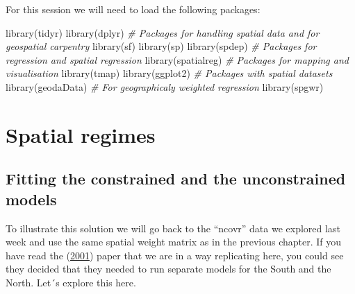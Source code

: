 \documentclass[
  krantz2]{krantz}
\makeatletter
\newenvironment{Shaded}{\begin{snugshade}}{\end{snugshade}}
\newcommand{\CommentTok}[1]{\textcolor[rgb]{0.37,0.37,0.37}{\textit{#1}}}
\newcommand{\FunctionTok}[1]{\textcolor[rgb]{0,0,0}{#1}}
\newcommand{\NormalTok}[1]{#1}
\newenvironment{kframe}{%
\medskip{}
\setlength{\fboxsep}{.8em}
 \def\at@end@of@kframe{}%
 \ifinner\ifhmode%
  \def\at@end@of@kframe{\end{minipage}}%
  \begin{minipage}{\columnwidth}%
 \fi\fi%
 \def\FrameCommand##1{\hskip\@totalleftmargin \hskip-\fboxsep
 \colorbox{shadecolor}{##1}\hskip-\fboxsep
     \hskip-\linewidth \hskip-\@totalleftmargin \hskip\columnwidth}%
 \MakeFramed {\advance\hsize-\width
   \@totalleftmargin\z@ \linewidth\hsize
   \@setminipage}}%
 {\par\unskip\endMakeFramed%
 \at@end@of@kframe}
\renewenvironment{Shaded}{\begin{kframe}}{\end{kframe}}
\makeatother
\begin{document}
For this session we will need to load the following packages:

\begin{Shaded}
\begin{Highlighting}[]
\FunctionTok{library}\NormalTok{(tidyr)}
\FunctionTok{library}\NormalTok{(dplyr)}
\CommentTok{\# Packages for handling spatial data and for geospatial carpentry}
\FunctionTok{library}\NormalTok{(sf)}
\FunctionTok{library}\NormalTok{(sp)}
\FunctionTok{library}\NormalTok{(spdep)}
\CommentTok{\# Packages for regression and spatial regression}
\FunctionTok{library}\NormalTok{(spatialreg)}
\CommentTok{\# Packages for mapping and visualisation}
\FunctionTok{library}\NormalTok{(tmap)}
\FunctionTok{library}\NormalTok{(ggplot2)}
\CommentTok{\# Packages with spatial datasets}
\FunctionTok{library}\NormalTok{(geodaData)}
\CommentTok{\# For geographicaly weighted regression}
\FunctionTok{library}\NormalTok{(spgwr)}
\end{Highlighting}
\end{Shaded}

\hypertarget{spatial-regimes}{%
\section{Spatial regimes}\label{spatial-regimes}}

\hypertarget{fitting-the-constrained-and-the-unconstrained-models}{%
\subsection{Fitting the constrained and the unconstrained models}\label{fitting-the-constrained-and-the-unconstrained-models}}

To illustrate this solution we will go back to the ``ncovr'' data we explored last week and use the same spatial weight matrix as in the previous chapter. If you have read the (\protect\hyperlink{ref-Baller_2001}{2001}) paper that we are in a way replicating here, you could see they decided that they needed to run separate models for the South and the North. Let´s explore this here.
\end{document}
